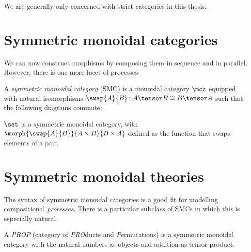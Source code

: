 We are generally only concerned with strict categories in this thesis.

\section{Symmetric monoidal categories}

We can now construct morphisms by composing them in sequence and in parallel.
However, there is one more facet of processes

\begin{definition}
    A \emph{symmetric monoidal category} (SMC) is a monoidal category \(\mcc\)
    equipped with natural isomorphisms \(
        \swap{A}{B} \colon A \tensor B \cong B \tensor A
    \) such that the following diagrams commute:
    \begin{center}
        
        

        \vspace{1em}

        
    \end{center}
\end{definition}

\begin{example}
    \(\set\) is a symmetric monoidal category, with \(
        \morph{\swap{A}{B}}{A \times B}{B \times A}
    \) defined as the function that swaps elements of a pair.
\end{example}

\section{Symmetric monoidal theories}

The syntax of symmetric monoidal categories is a good fit for modelling
compositional \emph{processes}.
There is a particular subclass of SMCs in which this is especially natural.

\begin{definition}
    A \emph{PROP} (category of \emph{PRO}ducts and \emph{P}ermutations) is a
    symmetric monoidal category with the natural numbers as objects and addition
    as tensor product.
\end{definition}

